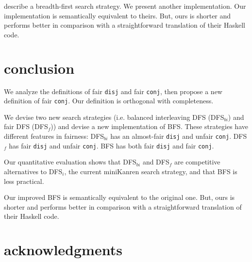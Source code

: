 \documentclass[format=acmlarge, review=true, authordraft=true]{acmart}
\newcommand{\conj}{\texttt{conj}}
\newcommand{\disj}{\texttt{disj}}
\newcommand{\DFSi }[0]{DFS$_{i}$}
\newcommand{\DFSf }[0]{DFS$_{f}$}
\newcommand{\DFSbi}[0]{DFS$_{bi}$}
\newcommand{\BFS}[0]{BFS}
\newcommand{\BFSser}[0]{BFS}
\begin{document}
\citet{seres1999algebra} describe a breadth-first search 
strategy. We present another implementation. Our implementation is semantically 
equivalent to theirs. But, ours is shorter and performs better in comparison 
with a straightforward translation of their Haskell code.


\section{conclusion}

We analyze the definitions of fair \disj{} and fair \conj{}, then propose a 
new definition of fair \conj{}. Our definition is orthogonal with completeness.

We devise two new search strategies (i.e. balanced interleaving DFS 
(\DFSbi{}) and fair DFS (\DFSf{})) and devise a new 
implementation of \BFS. These strategies have different features 
in fairness: \DFSbi{} has an almost-fair \disj{} and unfair \conj{}. 
\DFSf{} has fair \disj{} and unfair \conj{}. \BFS{} has both fair
\disj{} and fair \conj{}.

Our quantitative evaluation shows that \DFSbi{} and \DFSf{} are competitive 
alternatives to \DFSi{}, the current miniKanren search strategy,
and that \BFS{} is less practical.

Our improved \BFS{} is semantically equivalent to the original 
one. But, ours is shorter and performs better in comparison with a 
straightforward translation of their Haskell code.



\section*{acknowledgments}



\end{document}
